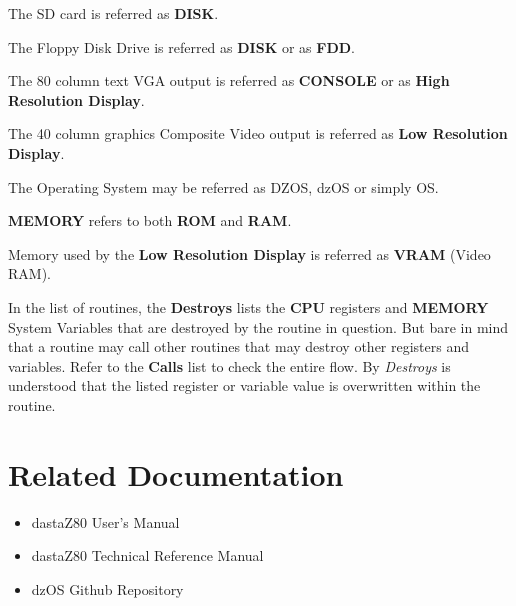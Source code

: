 \documentclass[a4paper,11pt]{article}
\begin{document}
    The SD card is referred as \textbf{DISK}.
    
    The Floppy Disk Drive is referred as \textbf{DISK} or as \textbf{FDD}.

    The 80 column text VGA output is referred as \textbf{CONSOLE} or as
    \textbf{High Resolution Display}.

    The 40 column graphics Composite Video output is referred as \textbf{Low
    Resolution Display}.

    The Operating System may be referred as DZOS, dzOS or simply OS.

    \textbf{MEMORY} refers to both \textbf{ROM} and \textbf{RAM}.

    Memory used by the \textbf{Low Resolution Display} is referred as
    \textbf{VRAM} (Video RAM).

    In the list of routines, the \textbf{Destroys} lists the \textbf{CPU}
    registers and \textbf{MEMORY} System Variables that are destroyed by the
    routine in question. But bare in mind that a routine may call other routines
    that may destroy other registers and variables. Refer to the \textbf{Calls}
    list to check the entire flow. By \textit{Destroys} is understood that the
    listed register or variable value is overwritten within the routine.

    \pagebreak
    \section*{Related Documentation}
    \begin{itemize}
        \item dastaZ80 User's Manual\cite{dastaz80userman}
        \item dastaZ80 Technical Reference Manual\cite{dastaz80techman}
        \item dzOS Github Repository\cite{dastaZ80github}
    \end{itemize}

    \pagebreak
    \tableofcontents

    \pagebreak
    \pagestyle{fancy}
    \fancyhf{}
    \fancyfoot[R]{\thepage}
    \setcounter{page}{1}
\end{document}
